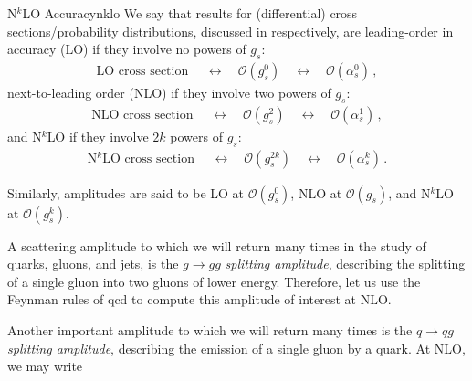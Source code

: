 \begin{definitionbox}{N\(^k\)LO Accuracy}{nklo}
    We say that results for (differential) cross sections/probability distributions, discussed in  respectively, are leading-order in accuracy (LO) if they involve no powers of \(g_s\):
    \begin{align}
        \text{LO cross section }
        \quad \leftrightarrow \quad
        \mathcal{O}(g_s^{0})
        \quad \leftrightarrow \quad
        \mathcal{O}(\alpha_s^0)
        \,,
    \end{align}
    next-to-leading order (NLO) if they involve two powers of \(g_s\):
    \begin{align}
        \text{NLO cross section }
        \quad \leftrightarrow \quad
        \mathcal{O}(g_s^{2})
        \quad \leftrightarrow \quad
        \mathcal{O}(\alpha_s^1)
        \,,
    \end{align}
    and N\(^k\)LO if they involve \(2k\) powers of \(g_s\):
    \begin{align}
        \text{N\(^k\)LO cross section }
        \quad \leftrightarrow \quad
        \mathcal{O}(g_s^{2k})
        \quad \leftrightarrow \quad
        \mathcal{O}(\alpha_s^k)
        \,.
    \end{align}

    Similarly, amplitudes are said to be LO at \(\mathcal{O}(g_s^0)\), NLO at \(\mathcal{O}(g_s)\), and N\(^k\)LO at \(\mathcal{O}(g_s^k)\).
\end{definitionbox}


\begin{example}
    \label{ex:gtogg-amplitude}
    A scattering amplitude to which we will return many times in the study of quarks, gluons, and jets, is the \(g \to gg\) \textit{splitting amplitude}, describing the splitting of a single gluon into two gluons of lower energy.
    Therefore, let us use the Feynman rules of \gls{qcd} to compute this amplitude of interest at NLO.

\end{example}

\begin{example}
    \label{ex:qtoqg-amplitude}
    Another important amplitude to which we will return many times is the \(q \to qg\) \textit{splitting amplitude}, describing the emission of a single gluon by a quark.
    At NLO, we may write

\end{example}


